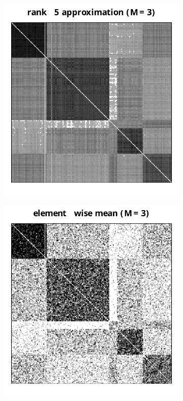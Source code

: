 \documentclass[10pt,letterpaper]{article}
\begin{document}
\begin{figure}
\begin{subfigure}{.4\textwidth}
\end{subfigure}
\begin{subfigure}{.4\textwidth}
  \centering
  \includegraphics[width=\linewidth]{SBM_Phat.pdf}
\end{subfigure}%
\begin{subfigure}{.4\textwidth}
  \centering
  \includegraphics[width=\linewidth]{SBM_Abar.pdf}

\end{subfigure}
\end{figure}
\end{document}
